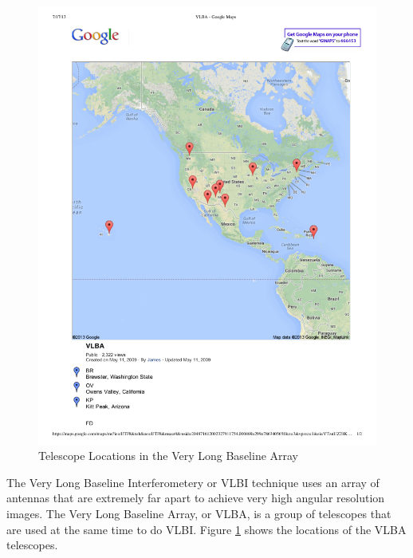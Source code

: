 \begin{figure}[ht!]
  \centering
    \includegraphics[width=\textwidth]{Images/C3/vlba.pdf}
  \caption{Telescope Locations in the Very Long Baseline Array}
  \label{fig: C3/vlba.pdf}
\end{figure}

The Very Long Baseline Interferometery or VLBI technique uses an array of antennas that are extremely far apart to achieve very high angular resolution images.
The Very Long Baseline Array, or VLBA, is a group of telescopes that are used at the same time to do VLBI.
Figure \ref{fig: C3/vlba.pdf} shows the locations of the VLBA telescopes.

